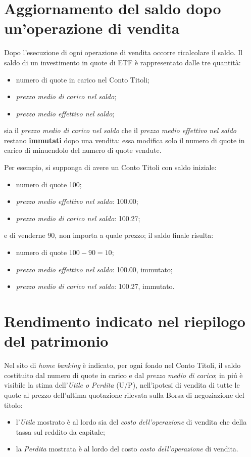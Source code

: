 \documentclass[12pt,a4paper]{article}
\newcommand{\Eur}[1]{\SI{#1}{\text{\euro{}}}}
\begin{document}
\section{Aggiornamento del saldo dopo un'operazione di vendita}


Dopo l'esecuzione  di ogni operazione  di vendita  occorre ricalcolare il  saldo.  Il
saldo di un investimento in quote di ETF è rappresentato dalle tre quantità:
\begin{itemize}
\item numero di quote in carico nel Conto Titoli;
\item \emph{prezzo medio di carico nel saldo};
\item \emph{prezzo medio effettivo nel saldo};
\end{itemize}
sia il  \emph{prezzo medio di carico  nel saldo} che il  \emph{prezzo medio effettivo
   nel  saldo} restano  \textbf{immutati} dopo  una  vendita: essa  modifica solo  il
numero di quote in carico di minuendolo del numero di quote vendute.

Per esempio, si supponga di avere un Conto Titoli con saldo iniziale:
\begin{itemize}
\item numero di quote \num{100};
\item \emph{prezzo medio effettivo nel saldo}: \Eur{100,00};
\item \emph{prezzo medio di carico nel saldo}: \Eur{100,27};
\end{itemize}
e di venderne \num{90}, non importa a quale prezzo; il saldo finale risulta:
\begin{itemize}
\item numero di quote \(\num{100} - \num{90} = \num{10}\);
\item \emph{prezzo medio effettivo nel saldo}: \Eur{100,00}, immutato;
\item \emph{prezzo medio di carico nel saldo}: \Eur{100,27}, immutato.
\end{itemize}

\section{Rendimento indicato nel riepilogo del patrimonio}


Nel sito di \emph{home banking} è indicato, per ogni fondo nel Conto Titoli, il saldo
costituito dal numero di quote in carico  e dal \emph{prezzo medio di carico}; in piú
è visibile  la stima dell'\emph{Utile  o Perdita}  (U/P), nell'ipotesi di  vendita di
tutte le quote al prezzo dell'ultima  quotazione rilevata sulla Borsa di negoziazione
del titolo:
\begin{itemize}
\item  l'\emph{Utile} mostrato  è al  lordo sia  del \emph{costo  dell'operazione} di
  vendita che della tassa sul reddito da capitale;
\item la \emph{Perdita} mostrata è al lordo del costo \emph{costo dell'operazione} di
  vendita.
\end{itemize}
\end{document}
